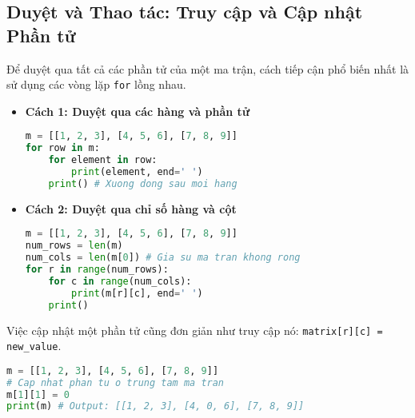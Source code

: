 \documentclass[11pt]{article}
\begin{document}
\subsection{Duyệt và Thao tác: Truy cập và Cập nhật Phần tử}
Để duyệt qua tất cả các phần tử của một ma trận, cách tiếp cận phổ biến nhất là sử dụng các vòng lặp \texttt{for} lồng nhau.
\begin{itemize}
    \item \textbf{Cách 1: Duyệt qua các hàng và phần tử}
    \begin{lstlisting}[language=Python]
m = [[1, 2, 3], [4, 5, 6], [7, 8, 9]]
for row in m:
    for element in row:
        print(element, end=' ')
    print() # Xuong dong sau moi hang
    \end{lstlisting}
    \item \textbf{Cách 2: Duyệt qua chỉ số hàng và cột}
    \begin{lstlisting}[language=Python]
m = [[1, 2, 3], [4, 5, 6], [7, 8, 9]]
num_rows = len(m)
num_cols = len(m[0]) # Gia su ma tran khong rong
for r in range(num_rows):
    for c in range(num_cols):
        print(m[r][c], end=' ')
    print()
    \end{lstlisting}
\end{itemize}
Việc cập nhật một phần tử cũng đơn giản như truy cập nó: \texttt{matrix[r][c] = new\_value}.
\begin{lstlisting}[language=Python]
m = [[1, 2, 3], [4, 5, 6], [7, 8, 9]]
# Cap nhat phan tu o trung tam ma tran
m[1][1] = 0
print(m) # Output: [[1, 2, 3], [4, 0, 6], [7, 8, 9]]
\end{lstlisting}
\end{document}
